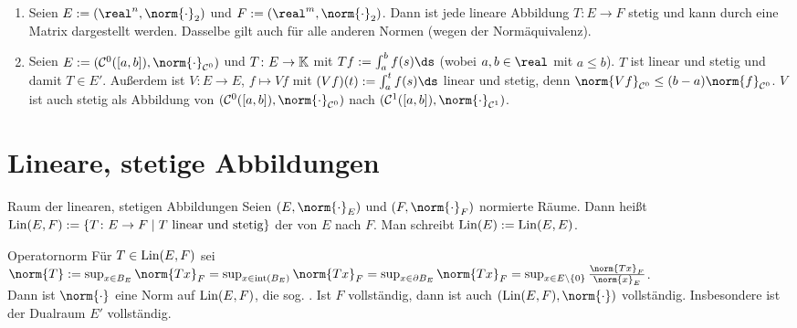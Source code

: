 \begin{Bsp}
    \begin{enumerate}[label=\emph{(\alph*)}]
        \item
        Seien $E := (\real^n, \norm{\cdot}_2)$ und $F := (\real^m, \norm{\cdot}_2)$.
        Dann ist jede lineare Abbildung $T\colon E \rightarrow F$ stetig und kann
        durch eine Matrix dargestellt werden.
        Dasselbe gilt auch für alle anderen Normen (wegen der Normäquivalenz).

        \item
        Seien $E := (\C^0([a, b]), \norm{\cdot}_{\C^0})$ und $T\colon E \rightarrow \mathbb{K}$
        mit $Tf := \int_a^b f(s)\ds$ (wobei $a, b \in \real$ mit $a \le b$).
        $T$ ist linear und stetig und damit $T \in E'$.
        Außerdem ist $V\colon E \rightarrow E$, $f \mapsto Vf$ mit
        $(Vf)(t) := \int_a^t f(s)\ds$ linear und stetig, denn
        $\norm{Vf}_{\C^0} \le (b - a) \norm{f}_{\C^0}$.
        $V$ ist auch stetig als Abbildung von
        $(\C^0([a, b]), \norm{\cdot}_{\C^0})$ nach
        $(\C^1([a, b]), \norm{\cdot}_{\C^1})$.
    \end{enumerate}
\end{Bsp}

\pagebreak

\section{%
    Lineare, stetige Abbildungen%
}

\begin{Def}{Raum der linearen, stetigen Abbildungen}
    Seien $(E, \norm{\cdot}_E)$ und $(F, \norm{\cdot}_F)$ normierte Räume.
    Dann heißt
    $\operatorname{Lin}(E, F) := \{T\colon E \rightarrow F \;|\; T \text{ linear und stetig}\}$
    der  von $E$ nach $F$.
    Man schreibt $\operatorname{Lin}(E) := \operatorname{Lin}(E, E)$.
\end{Def}

\begin{Satz}{Operatornorm}
    Für $T \in \operatorname{Lin}(E, F)$ sei\\
    $\norm{T} := \sup_{x \in B_E} \norm{Tx}_F =
    \sup_{x \in \interior{B_E}} \norm{Tx}_F = \sup_{x \in \partial B_E} \norm{Tx}_F =
    \sup_{x \in E \setminus \{0\}} \frac{\norm{Tx}_F}{\norm{x}_E}$.\\
    Dann ist $\norm{\cdot}$ eine Norm auf $\operatorname{Lin}(E, F)$, die sog. .
    Ist $F$ vollständig, dann ist auch $(\Lin(E, F), \norm{\cdot})$ vollständig.
    Insbesondere ist der Dualraum $E'$ vollständig.
\end{Satz}

